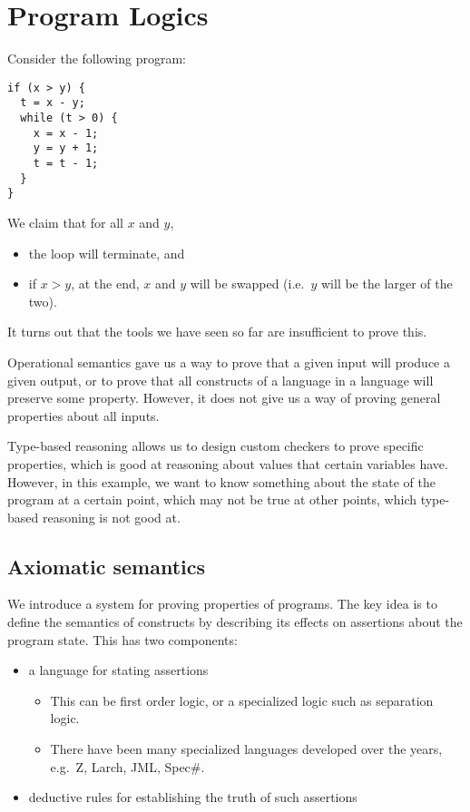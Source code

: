\documentclass[class=scrartcl]{standalone}
\begin{document}
\chapter{Program Logics}
Consider the following program:
\begin{verbatim}
if (x > y) {
  t = x - y;
  while (t > 0) {
    x = x - 1;
    y = y + 1;
    t = t - 1;
  }
}
\end{verbatim}
We claim that for all \(x\) and \(y\),
\begin{itemize}[nosep]
  \item the loop will terminate, and
  \item if \(x > y\), at the end, \(x\) and \(y\) will be swapped
        (i.e.\ \(y\) will be the larger of the two).
\end{itemize}
It turns out that the tools we have seen so far are insufficient to prove this.

Operational semantics gave us a way to prove that
a given input will produce a given output,
or to prove that all constructs of a language in a language
will preserve some property.
However, it does not give us a way of proving
general properties about all inputs.

Type-based reasoning allows us to
design custom checkers to prove specific properties,
which is good at reasoning about values that certain variables have.
However, in this example, we want to know something
about the state of the program at a certain point,
which may not be true at other points,
which type-based reasoning is not good at.

\section{Axiomatic semantics}
We introduce a system for proving properties of programs.
The key idea is to define the semantics of constructs
by describing its effects on assertions about the program state.
This has two components:
\begin{itemize}[nosep]
  \item a language for stating assertions
  \begin{itemize}[nosep]
    \item This can be first order logic,
          or a specialized logic such as separation logic.
    \item There have been many specialized languages developed
          over the years, e.g.\ Z, Larch, JML, Spec\#.
  \end{itemize}
  \item deductive rules for establishing the truth of such assertions
\end{itemize}
\end{document}
